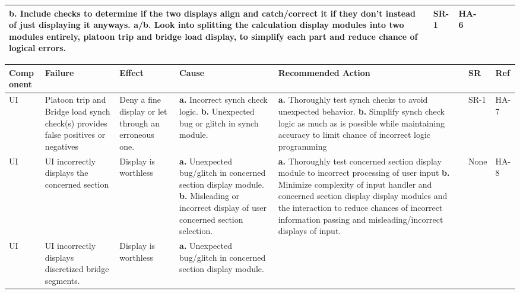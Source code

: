 \documentclass{article}
\begin{document}
\begin{landscape}
\begin{table}[H]
\begin{tabular}{|p{} | p{} | p{} | p{} | p{} | p{} | p{}|}
\textbf{b.} Include checks to determine if the two displays align and catch/correct it if they don’t instead of just displaying it anyways.\newline
\textbf{a/b.} Look into splitting the calculation display modules into two modules entirely, platoon trip and bridge load display, to simplify each part and 
reduce chance of logical errors.
&SR-1&HA-6\\
\bottomrule
  \end{tabular}
  \end{table}
  \pagebreak
  \begin{table}[H]
    \begin{tabular}{|p{} | p{} | p{} | p{} | p{} | p{} | p{}|}
      \toprule
      \textbf{Comp onent} & \textbf{Failure} & \textbf{Effect} & \textbf{Cause} & \textbf{Recommended Action} & \textbf{SR} & \textbf{Ref}\\
  \midrule
      UI & Platoon trip and Bridge load synch check(s) provides false positives or negatives &  Deny a fine display or let through an erroneous one.
    & \textbf{a.} Incorrect synch check logic.\newline
      \textbf{b.} Unexpected bug or glitch in synch module.
    & \textbf{a.} Thoroughly test synch checks to avoid unexpected behavior.\newline
      \textbf{b.} Simplify synch check logic as much as is possible while maintaining accuracy to limit chance of incorrect logic programming
    &SR-1&HA-7\\
  \midrule
      UI&UI incorrectly displays the concerned section&Display is worthless& \textbf{a.} Unexpected bug/glitch in concerned section display module.\newline
      \textbf{b.} Misleading or incorrect display of user concerned section selection.
    & \textbf{a.} Thoroughly test concerned section display module to incorrect processing of user input\newline
      \textbf{b.} Minimize complexity of input handler and concerned section display display modules and the interaction to reduce chances of 
      incorrect information passing and misleading/incorrect displays of input.
      &None&HA-8\\
  \midrule
      UI&UI incorrectly displays discretized bridge segments.
      &Display is worthless& \textbf{a.} Unexpected bug/glitch in concerned section display module.\newline

\end{tabular}
\end{table}
\end{landscape}
\end{document}
